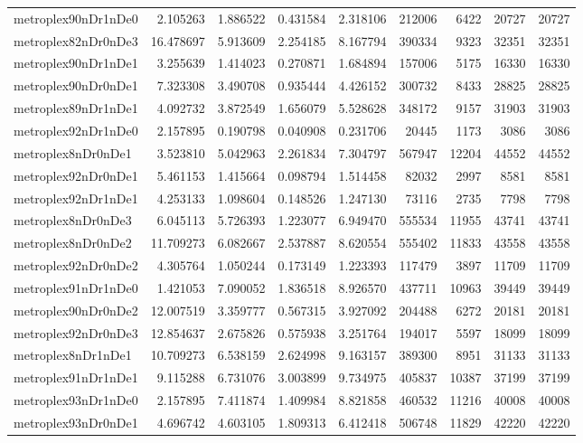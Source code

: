 \begin{longtable}{|l|r|r|r|r|r|r|r|r|}
metroplex90nDr1nDe0 & 2.105263 & 1.886522 & 0.431584 & 2.318106 & 212006 & 6422 & 20727 & 20727 \\
metroplex82nDr0nDe3 & 16.478697 & 5.913609 & 2.254185 & 8.167794 & 390334 & 9323 & 32351 & 32351 \\
metroplex90nDr1nDe1 & 3.255639 & 1.414023 & 0.270871 & 1.684894 & 157006 & 5175 & 16330 & 16330 \\
metroplex90nDr0nDe1 & 7.323308 & 3.490708 & 0.935444 & 4.426152 & 300732 & 8433 & 28825 & 28825 \\
metroplex89nDr1nDe1 & 4.092732 & 3.872549 & 1.656079 & 5.528628 & 348172 & 9157 & 31903 & 31903 \\
metroplex92nDr1nDe0 & 2.157895 & 0.190798 & 0.040908 & 0.231706 & 20445 & 1173 & 3086 & 3086 \\
metroplex8nDr0nDe1 & 3.523810 & 5.042963 & 2.261834 & 7.304797 & 567947 & 12204 & 44552 & 44552 \\
metroplex92nDr0nDe1 & 5.461153 & 1.415664 & 0.098794 & 1.514458 & 82032 & 2997 & 8581 & 8581 \\
metroplex92nDr1nDe1 & 4.253133 & 1.098604 & 0.148526 & 1.247130 & 73116 & 2735 & 7798 & 7798 \\
metroplex8nDr0nDe3 & 6.045113 & 5.726393 & 1.223077 & 6.949470 & 555534 & 11955 & 43741 & 43741 \\
metroplex8nDr0nDe2 & 11.709273 & 6.082667 & 2.537887 & 8.620554 & 555402 & 11833 & 43558 & 43558 \\
metroplex92nDr0nDe2 & 4.305764 & 1.050244 & 0.173149 & 1.223393 & 117479 & 3897 & 11709 & 11709 \\
metroplex91nDr1nDe0 & 1.421053 & 7.090052 & 1.836518 & 8.926570 & 437711 & 10963 & 39449 & 39449 \\
metroplex90nDr0nDe2 & 12.007519 & 3.359777 & 0.567315 & 3.927092 & 204488 & 6272 & 20181 & 20181 \\
metroplex92nDr0nDe3 & 12.854637 & 2.675826 & 0.575938 & 3.251764 & 194017 & 5597 & 18099 & 18099 \\
metroplex8nDr1nDe1 & 10.709273 & 6.538159 & 2.624998 & 9.163157 & 389300 & 8951 & 31133 & 31133 \\
metroplex91nDr1nDe1 & 9.115288 & 6.731076 & 3.003899 & 9.734975 & 405837 & 10387 & 37199 & 37199 \\
metroplex93nDr1nDe0 & 2.157895 & 7.411874 & 1.409984 & 8.821858 & 460532 & 11216 & 40008 & 40008 \\
metroplex93nDr0nDe1 & 4.696742 & 4.603105 & 1.809313 & 6.412418 & 506748 & 11829 & 42220 & 42220 \\

\end{longtable}
